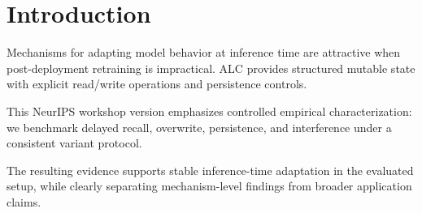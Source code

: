 \section{Introduction}
Mechanisms for adapting model behavior at inference time are attractive when post-deployment retraining is impractical. ALC provides structured mutable state with explicit read/write operations and persistence controls.

This NeurIPS workshop version emphasizes controlled empirical characterization: we benchmark delayed recall, overwrite, persistence, and interference under a consistent variant protocol.

The resulting evidence supports stable inference-time adaptation in the evaluated setup, while clearly separating mechanism-level findings from broader application claims.
